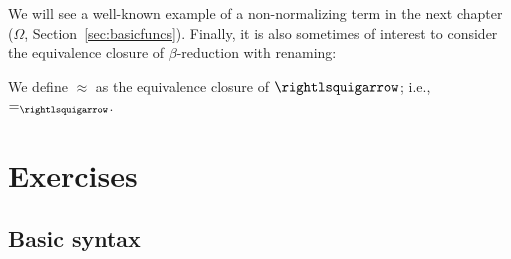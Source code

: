 We will see a well-known example of a non-normalizing term in the next
chapter ($\Omega$, Section~\ref{sec:basicfuncs}).  Finally, it is also
sometimes of interest to consider the equivalence closure of
$\beta$-reduction with renaming:

\begin{definition}
  We define $\approx$ as the equivalence closure of $\curva$; i.e., $=_{\curva}$.
  \end{definition}

\section{Exercises}

\subsection{Basic syntax}

